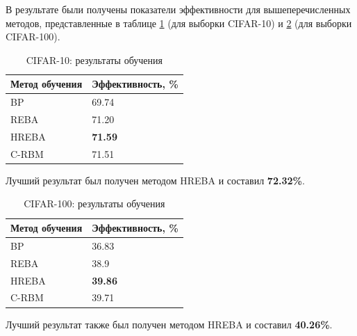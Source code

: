 В результате были получены показатели эффективности для вышеперечисленных методов, представленные в таблице \ref{table:cifar_10_results} (для выборки CIFAR-10) и \ref{table:cifar_100_results} (для выборки CIFAR-100).

\begin{table} [!h]
  \centering
  \caption{CIFAR-10: результаты обучения}\label{table:cifar_10_results}
  \begin{tabular}{| p{6cm} | p{6cm} |}
    \hline
      \textbf{Метод обучения} & \textbf{Эффективность, \%}\\
      \hline
      BP & 69.74\\
      \hline
      REBA & 71.20\\
      \hline
      HREBA & \textbf{71.59}\\
      \hline
      C-RBM & 71.51\\
      \hline
  \end{tabular}
\end{table}

Лучший результат был получен методом HREBA и составил \textbf{72.32\%}.

\begin{table} [!h]
  \centering
  \caption{CIFAR-100: результаты обучения}\label{table:cifar_100_results}
  \begin{tabular}{| p{6cm} | p{6cm} |}
    \hline
      \textbf{Метод обучения} & \textbf{Эффективность, \%}\\
      \hline
      BP & 36.83\\
      \hline
      REBA & 38.9\\
      \hline
      HREBA & \textbf{39.86}\\
      \hline
      C-RBM & 39.71\\
      \hline
  \end{tabular}
\end{table}

Лучший результат также был получен методом HREBA и составил \textbf{40.26\%}.



